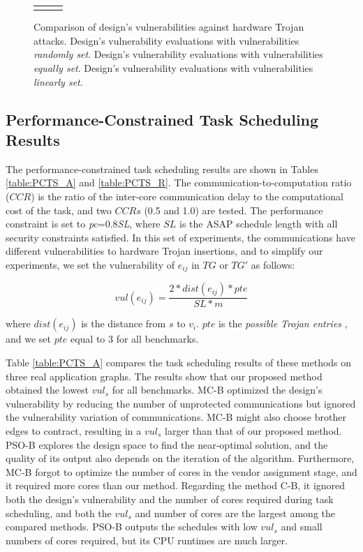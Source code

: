 \documentclass[10pt,journal, compsoc]{IEEEtran}
\begin{document}
\begin{figure}[!t]
\begin{tabular}{ccc}
{}
\end{tabular}
\caption{Comparison of design's vulnerabilities against hardware Trojan attacks.  Design's vulnerability evaluations with vulnerabilities \textit{randomly set}.  Design's vulnerability evaluations with vulnerabilities \textit{equally set}.  Design's vulnerability evaluations with vulnerabilities \textit{linearly set}.}
\vspace*{-0.9em}
\label{fig:system_risk}
\end{figure}


\subsection{Performance-Constrained Task Scheduling Results}

The performance-constrained task scheduling results are shown in Tables \ref{table:PCTS_A} and \ref{table:PCTS_R}. The communication-to-computation ratio ($CCR$) is the ratio of the inter-core communication delay to the computational cost of the task, and two $CCRs$ (0.5 and 1.0) are tested. The performance constraint is set to \textit{pc}=0.8\textit{SL}, where $SL$ is the ASAP schedule length with all security constraints satisfied. In this set of experiments, the communications have different vulnerabilities to hardware Trojan insertions, and to simplify our experiments, we set the vulnerability of $e_{ij}$ in $TG$ or $TG'$ as follows:

\begin{equation}
 vul(e_{ij})=\frac{2*dist(e_{ij})*pte}{SL*m}
\label{equ:risk_set1}
\end{equation}

\noindent where $dist(e_{ij})$ is the distance from $s$ to $v_i$. $pte$ is the \textit{possible Trojan entries} \cite{article:SR}, and we set $pte$ equal to 3 for all benchmarks.

Table \ref{table:PCTS_A} compares the task scheduling results of these methods on three real application graphs. The results show that our proposed method obtained the lowest $vul_s$ for all benchmarks. MC-B optimized the design's vulnerability by reducing the number of unprotected communications but ignored the vulnerability variation of communications. MC-B might also choose brother edges to contract, resulting in a $vul_s$ larger than that of our proposed method. PSO-B explores the design space to find the near-optimal solution, and the quality of its output also depends on the iteration of the algorithm. Furthermore, MC-B forgot to optimize the number of cores in the vendor assignment stage, and it required more cores than our method. Regarding the method C-B, it ignored both the design's vulnerability and the number of cores required during task scheduling, and both the $vul_s$ and number of cores are the largest among the compared methods. PSO-B outputs the schedules with low $vul_s$ and small numbers of cores required, but its CPU runtimes are much larger.
\end{document}
